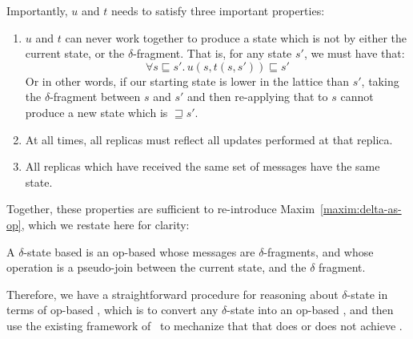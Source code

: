 Importantly, $u$ and $t$ needs to satisfy three important properties:
\begin{enumerate}
  \item $u$ and $t$ can never work together to produce a state which is not
    by either the current state, or the $\delta$-fragment. That is, for any
    state $s'$, we must have that:
    \[
      \forall s \sqsubseteq s'.\, u(s, t(s, s')) \sqsubseteq s'
    \]
    Or in other words, if our starting state is lower in the lattice than $s'$,
    taking the $\delta$-fragment between $s$ and $s'$ and then re-applying that
    to $s$ cannot produce a new state which is $\sqsupseteq s'$.
  \item At all times, all replicas must reflect all updates performed at that
    replica.
  \item All replicas which have received the same set of messages have the same
    state.
\end{enumerate}

Together, these properties are sufficient to re-introduce
Maxim~\ref{maxim:delta-as-op}, which we restate here for clarity:
\setcounter{maxim}{1}
\begin{maxim}
  A $\delta$-state based \CRDT is an op-based \CRDT whose messages are
  $\delta$-fragments, and whose operation is a pseudo-join between the current
  state, and the $\delta$ fragment.
\end{maxim}

Therefore, we have a straightforward procedure for reasoning about
$\delta$-state \CRDTs in terms of op-based \CRDTs, which is to convert any
$\delta$-state \CRDT into an op-based \CRDT, and then use the existing framework
of~\citet{gomes17} to mechanize that that \CRDT does or does not achieve \SEC.
